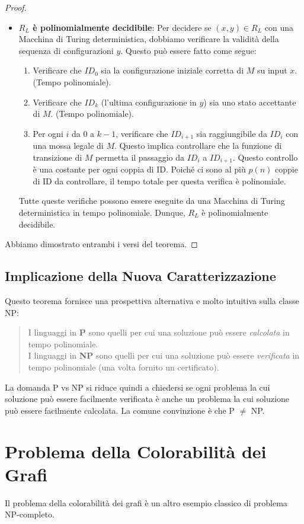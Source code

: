 \documentclass[a4paper]{article}
\theoremstyle{definition} %
\begin{document}
\begin{proof}
\begin{itemize}
    \item \textbf{$R_L$ è polinomialmente decidibile}:
    Per decidere se $(x, y) \in R_L$ con una Macchina di Turing deterministica, dobbiamo verificare la validità della sequenza di configurazioni $y$. Questo può essere fatto come segue:
    \begin{enumerate}
        \item Verificare che $ID_0$ sia la configurazione iniziale corretta di $M$ su input $x$. (Tempo polinomiale).
        \item Verificare che $ID_k$ (l'ultima configurazione in $y$) sia uno stato accettante di $M$. (Tempo polinomiale).
        \item Per ogni $i$ da $0$ a $k-1$, verificare che $ID_{i+1}$ sia raggiungibile da $ID_i$ con una mossa legale di $M$. Questo implica controllare che la funzione di transizione di $M$ permetta il passaggio da $ID_i$ a $ID_{i+1}$. Questo controllo è una costante per ogni coppia di ID. Poiché ci sono al più $p(n)$ coppie di ID da controllare, il tempo totale per questa verifica è polinomiale.
    \end{enumerate}
    Tutte queste verifiche possono essere eseguite da una Macchina di Turing deterministica in tempo polinomiale. Dunque, $R_L$ è polinomialmente decidibile.
\end{itemize}
Abbiamo dimostrato entrambi i versi del teorema.
\end{proof}

\subsection{Implicazione della Nuova Caratterizzazione}
Questo teorema fornisce una prospettiva alternativa e molto intuitiva sulla classe NP:
\begin{quote}
    I linguaggi in \textbf{P} sono quelli per cui una soluzione può essere \emph{calcolata} in tempo polinomiale. \\
    I linguaggi in \textbf{NP} sono quelli per cui una soluzione può essere \emph{verificata} in tempo polinomiale (una volta fornito un certificato).
\end{quote}
La domanda P vs NP si riduce quindi a chiedersi se ogni problema la cui soluzione può essere facilmente verificata è anche un problema la cui soluzione può essere facilmente calcolata. La comune convinzione è che P $\ne$ NP.

\section{Problema della Colorabilità dei Grafi}
Il problema della colorabilità dei grafi è un altro esempio classico di problema NP-completo.
\end{document}
